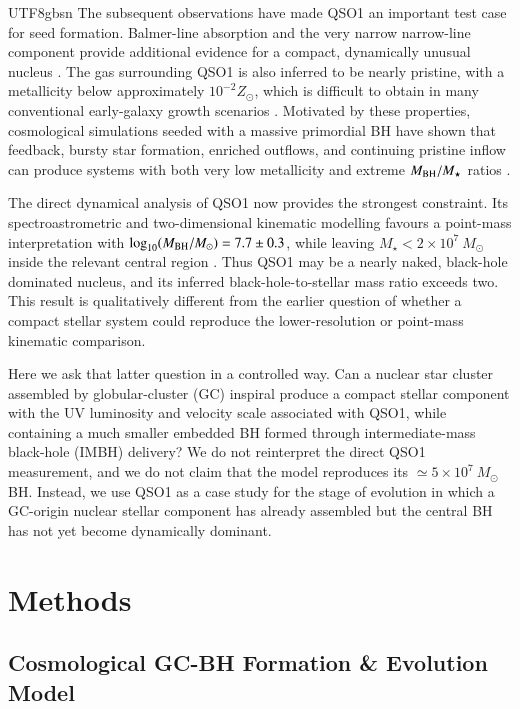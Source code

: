 \documentclass[trackchanges, twocolappendix, twocolumn]{aastex701}
\begin{document}
\begin{CJK*}{UTF8}{gbsn}
The subsequent observations have made QSO1 an important test case for seed
formation. Balmer-line absorption and the very narrow narrow-line component
provide additional evidence for a compact, dynamically unusual nucleus
\citep{DEugenio2025}. The gas surrounding QSO1 is also inferred to be nearly
pristine, with a metallicity below approximately $10^{-2}Z_\odot$, which is
difficult to obtain in many conventional early-galaxy growth scenarios
\citep{Maiolino2025_QSO1}. Motivated by these properties, cosmological
simulations seeded with a massive primordial BH have shown that feedback,
bursty star formation, enriched outflows, and continuing pristine inflow can
produce systems with both very low metallicity and extreme
$M_{\rm BH}/M_\star$ ratios \citep{Zhang2025_hydrosim_QSO1}.

The direct dynamical analysis of QSO1 now provides the strongest constraint.
Its spectroastrometric and two-dimensional kinematic modelling favours a
point-mass interpretation with
$\log_{10}(M_{\rm BH}/M_\odot)=7.7\pm0.3$, while leaving
$M_\star<2\times10^7~M_\odot$ inside the relevant central region
\citep{Juodzbalis2025_QSO1}. Thus QSO1 may be a nearly naked, black-hole
dominated nucleus, and its inferred black-hole-to-stellar mass ratio exceeds
two. This result is qualitatively different from the earlier question of
whether a compact stellar system could reproduce the lower-resolution or
point-mass kinematic comparison.

Here we ask that latter question in a controlled way. Can a nuclear star
cluster assembled by globular-cluster (GC) inspiral produce a compact stellar
component with the UV luminosity and velocity scale associated with QSO1,
while containing a much smaller embedded BH formed through intermediate-mass
black-hole (IMBH) delivery? We do not reinterpret the direct QSO1 measurement,
and we do not claim that the model reproduces its
$\simeq5\times10^7~M_\odot$ BH. Instead, we use QSO1 as a case study for the
stage of evolution in which a GC-origin nuclear stellar component has already
assembled but the central BH has not yet become dynamically dominant.

\section{Methods} \label{sect:method}

\subsection{Cosmological GC-BH Formation \& Evolution Model} \label{subsect:model}


\end{CJK*}
\end{document}
